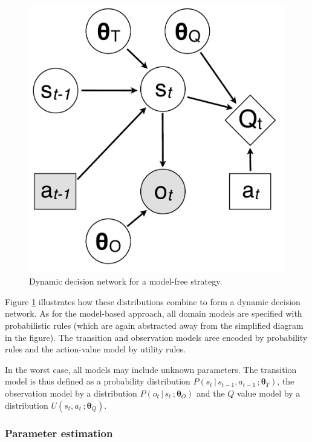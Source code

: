 \begin{figure}
\vspace{-2mm}
\centering
\includegraphics[scale=0.25]{imgs/modelfreediagram.pdf}
\vspace{-2mm}
\caption{Dynamic decision network for a model-free strategy.}
\label{fig:modelfreediagram}
\end{figure}

Figure \ref{fig:modelfreediagram} illustrates how these distributions combine to form a dynamic decision network. As for the model-based approach, all domain models are specified with probabilistic rules (which are again abstracted away from the simplified diagram in the figure). The transition and observation models aree encoded by probability rules and the action-value model by utility rules. 

In the worst case, all models may include unknown parameters.  The transition model is thus defined as a probability distribution $P(s_t \, | \, s_{t-1}, a_{t-1} \,; \boldsymbol\theta_T)$, the observation model by a distribution $P(o_t \, | \, s_t\,; \boldsymbol\theta_O)$ and the $Q$ value model by a distribution $U(s_t,a_t\,; \boldsymbol\theta_Q)$.  

\subsubsection*{Parameter estimation}

